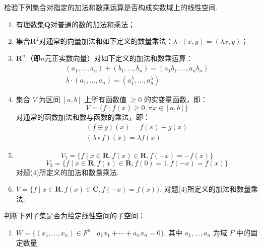 \begin{exercise}

    \begin{exgroup}
        \item 检验下列集合对指定的加法和数乘运算是否构成实数域上的线性空间.
        \begin{enumerate}
            \item 有理数集$\mathbf{Q}$对普通的数的加法和乘法；

            \item 集合$\mathbf{R}^2$对通常的向量加法和如下定义的数量乘法：$\lambda\cdot(x,y)=(\lambda x,y)$；

            \item $\mathbf{R}_+^n$（即$n$元正实数向量）对如下定义的加法和数乘运算：
                  \begin{gather*}
                      (a_1,\ldots,a_n)+(b_1,\ldots,b_n)=(a_1b_1,\ldots,a_nb_n) \\
                      \lambda\cdot(a_1,\ldots,a_n)=(a_1^\lambda,\ldots,a_n^\lambda)
                  \end{gather*}

            \item 集合 $V$ 为区间 $[a, b]$ 上所有函数值 $\geqslant 0$ 的实变量函数，即：
                  \[V=\{f \mid f(x) \geqslant 0, \forall x \in [a, b] \}\]
                  对通常的函数加法和数与函数的乘法，即：
                  \begin{gather*}
                      (f \oplus g)(x) = f(x) + g(x) \\
                      (\lambda \circ f)(x) = \lambda f(x)
                  \end{gather*}

            \item \[V_1= \{f \mid x \in \mathbf{R}, f(x) \in \mathbf{R}, f(-x)=-f(x)\}\]
                  \[V_2= \{f \mid x \in \mathbf{R}, f(x) \in \mathbf{R}, f(0)=1, f(-x)=f(x)\}\]
                  对题(4)所定义的加法和数量乘法.

            \item $V = \{f \mid x \in \mathbf{R}, f(x) \in \mathbf{C}, f(-x)= \overline{f(x)} \}$.
                  对题(4)所定义的加法和数量乘法.
        \end{enumerate}

        \item 判断下列子集是否为给定线性空间的子空间：
        \begin{enumerate}
            \item $W = \{(x_1,\ldots,x_n) \in F^n \mid a_1 x_1+\cdots +a_n x_n =0\}$, 其中 $a_1, \ldots, a_n$ 为域 $F$ 中的固定数量.


\end{enumerate}
\end{exgroup}
\end{exercise}
